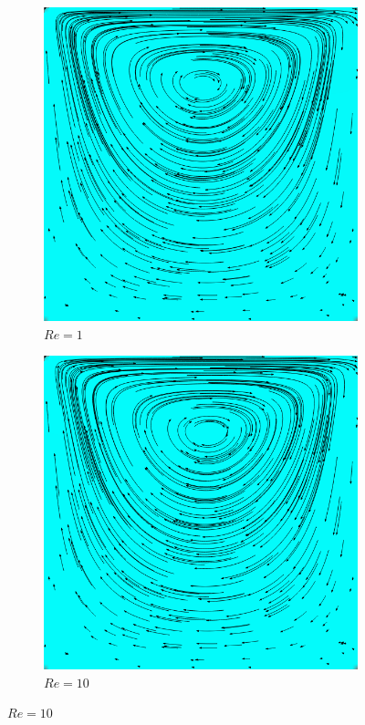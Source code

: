 		\begin{figure}[!htb]
			\begin{subfigure}[b]{.5\textwidth}
				\center
				\includegraphics[scale = 0.28]{screenshots/re-1.png}
				\caption{$Re=1$}
				\label{fig:re 1}
			\end{subfigure}
			\begin{subfigure}[b]{.5\textwidth}
				\center
				\includegraphics[scale = 0.28]{screenshots/re-10.png}
				\caption{$Re=10$}
				\label{fig:re 10}
			\end{subfigure}
			

\end{figure}

